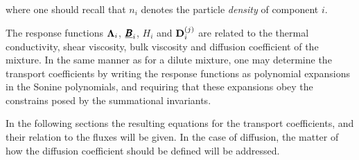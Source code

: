 where one should recall that $n_i$ denotes the particle \textit{density} of component $i$.

The response functions $\boldsymbol{\mathrm{\Lambda}}_i$, $\underline{\pmb{B}}_i$, $H_i$ and $\boldsymbol{\mathrm{D}}_i^{(j)}$ are related to the thermal conductivity, shear viscosity, bulk viscosity and diffusion coefficient of the mixture. In the same manner as for a dilute mixture, one may determine the transport coefficients by writing the response functions as polynomial expansions in the Sonine polynomials, and requiring that these expansions obey the constrains posed by the summational invariants.

In the following sections the resulting equations for the transport coefficients, and their relation to the fluxes will be given. In the case of diffusion, the matter of how the diffusion coefficient should be defined will be addressed.
